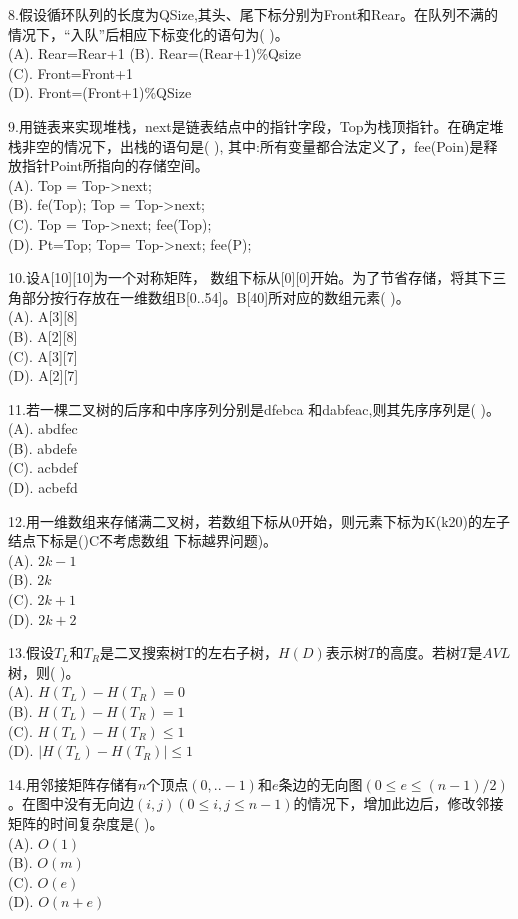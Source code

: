 8.假设循环队列的长度为QSize,其头、尾下标分别为Front和Rear。在队列不满的情况下，“入队”后相应下标变化的语句为( )。 \\
(A). Rear=Rear+1
(B). Rear=(Rear+1)\%Qsize \\
(C). Front=Front+1 \\
(D). Front=(Front+1)\%QSize

9.用链表来实现堆栈，next是链表结点中的指针字段，Top为栈顶指针。在确定堆栈非空的情况下，出栈的语句是( ), 其中:所有变量都合法定义了，fee(Poin)是释 放指针Point所指向的存储空间。  \\
(A). Top = Top->next; \\
(B). fe(Top); Top = Top->next; \\
(C). Top = Top->next; fee(Top); \\
(D). Pt=Top; Top= Top->next; fee(P);

10.设A[10][10]为一个对称矩阵， 数组下标从[0][0]开始。为了节省存储，将其下三角部分按行存放在一维数组B[0..54]。B[40]所对应的数组元素( )。 \\
(A). A[3][8] \\
(B). A[2][8] \\
(C). A[3][7] \\
(D). A[2][7]

11.若一棵二叉树的后序和中序序列分别是dfebca 和dabfeac,则其先序序列是( )。 \\
(A). abdfec \\
(B). abdefe \\
(C). acbdef \\
(D). acbefd

12.用一维数组来存储满二叉树，若数组下标从0开始，则元素下标为K(k20)的左子结点下标是()C不考虑数组 下标越界问题)。 \\
(A). $2k-1$ \\
(B). $2k$ \\
(C). $2k+1$ \\
(D). $2k+2$

13.假设$T_L$和$T_R$是二叉搜索树T的左右子树，$H(D)$表示树$T$的高度。若树$T$是$AVL$树，则( )。 \\
(A). $H(T_L)-H(T_R)=0$ \\
(B). $H(T_L)-H(T_R)=1$ \\
(C). $H(T_L)-H(T_R)\leqslant1$ \\
(D). $|H(T_L)-H(T_R)|\leqslant1$

14.用邻接矩阵存储有$n$个顶点$(0,..-1)$和$e$条边的无向图$(0\leqslant e\leqslant(n-1)/2)$。在图中没有无向边$(i,j)(0\leqslant i,j\leqslant n-1)$的情况下，增加此边后，修改邻接矩阵的时间复杂度是( )。 \\
(A). $O(1)$ \\
(B). $O(m)$ \\
(C). $O(e)$ \\
(D). $O(n+e)$

